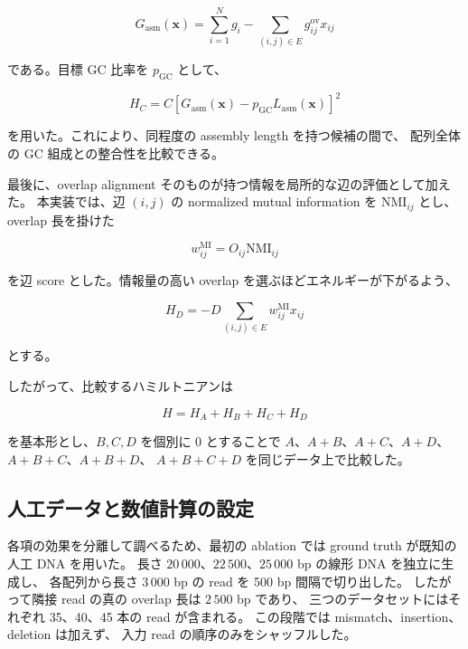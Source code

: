 \documentclass[a4j,10pt]{ujarticle}
\begin{document}
\[
G_{\mathrm{asm}}(\boldsymbol{x})
=
\sum_{i=1}^{N}g_i
-
\sum_{(i,j)\in E}g_{ij}^{\mathrm{ov}}x_{ij}
\]

である。目標 GC 比率を $p_{\mathrm{GC}}$ として、

\begin{equation}
H_C
=
C
\left[
G_{\mathrm{asm}}(\boldsymbol{x})
-
p_{\mathrm{GC}}
L_{\mathrm{asm}}(\boldsymbol{x})
\right]^2
\label{eq:H_gc_abcd}
\end{equation}

を用いた。これにより、同程度の assembly length を持つ候補の間で、
配列全体の GC 組成との整合性を比較できる。

最後に、overlap alignment そのものが持つ情報を局所的な辺の評価として加えた。
本実装では、辺 $(i,j)$ の normalized mutual information を
$\mathrm{NMI}_{ij}$ とし、overlap 長を掛けた

\[
w_{ij}^{\mathrm{MI}}
=
O_{ij}\mathrm{NMI}_{ij}
\]

を辺 score とした。情報量の高い overlap を選ぶほどエネルギーが下がるよう、

\begin{equation}
H_D
=
-D
\sum_{(i,j)\in E}
w_{ij}^{\mathrm{MI}}x_{ij}
\label{eq:H_mi_abcd}
\end{equation}

とする。

したがって、比較するハミルトニアンは

\begin{equation}
H
=
H_A+H_B+H_C+H_D
\label{eq:abcd_total}
\end{equation}

を基本形とし、$B,C,D$ を個別に 0 とすることで
$A$、$A+B$、$A+C$、$A+D$、$A+B+C$、$A+B+D$、
$A+B+C+D$ を同じデータ上で比較した。


\subsection{人工データと数値計算の設定}

各項の効果を分離して調べるため、最初の ablation では
ground truth が既知の人工 DNA を用いた。
長さ $20\,000$、$22\,500$、$25\,000$ bp の線形 DNA を独立に生成し、
各配列から長さ $3\,000$ bp の read を 500 bp 間隔で切り出した。
したがって隣接 read の真の overlap 長は $2\,500$ bp であり、
三つのデータセットにはそれぞれ 35、40、45 本の read が含まれる。
この段階では mismatch、insertion、deletion は加えず、
入力 read の順序のみをシャッフルした。
\end{document}
